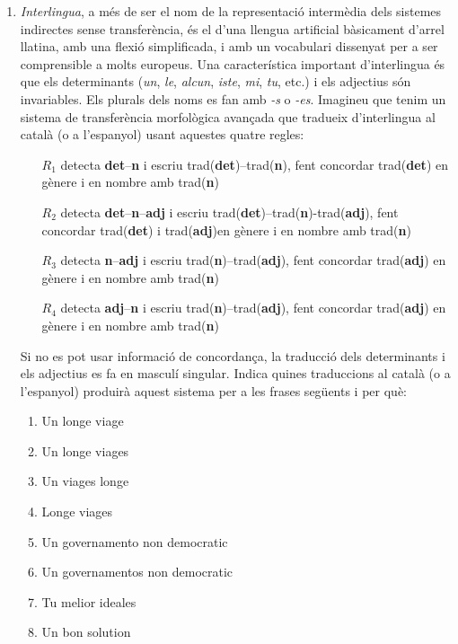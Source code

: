\begin{enumerate}
    \item \emph{Interlingua}, a més de ser el nom de la representació
      intermèdia dels sistemes indirectes sense transferència, és el
      d'una llengua artificial bàsicament d'arrel llatina, amb una
      flexió simplificada, i amb un vocabulari dissenyat per a ser
      comprensible a molts europeus.  Una característica important
      d'interlingua és que els determinants (\emph{un}, \emph{le},
      \emph{alcun}, \emph{iste}, \emph{mi}, \emph{tu}, etc.) i els
      adjectius són invariables. Els plurals dels noms es fan amb
      \emph{-s} o \emph{-es}.  Imagineu que tenim un sistema de
      transferència morfològica avançada que tradueix d'interlingua al
      català (o a l'espanyol) usant aquestes quatre regles:
      \begin{itemize}
      \item[$R_1$] detecta \textbf{det}--\textbf{n} i escriu
        \textsf{trad}(\textbf{det})--\textsf{trad}(\textbf{n}), fent concordar
        \textsf{trad}(\textbf{det}) en gènere i en nombre amb \textsf{trad}(\textbf{n})
      \item[$R_2$] detecta \textbf{det}--\textbf{n}--\textbf{adj} i escriu
        \textsf{trad}(\textbf{det})--\textsf{trad}(\textbf{n})-\textsf{trad}(\textbf{adj}), fent
        concordar \textsf{trad}(\textbf{det}) i \textsf{trad}(\textbf{adj})en gènere i
        en nombre amb \textsf{trad}(\textbf{n})
      \item[$R_3$] detecta \textbf{n}--\textbf{adj} i escriu
        \textsf{trad}(\textbf{n})--\textsf{trad}(\textbf{adj}), fent concordar
        \textsf{trad}(\textbf{adj}) en gènere i en nombre amb \textsf{trad}(\textbf{n})
      \item[$R_4$] detecta \textbf{adj}--\textbf{n} i escriu
        \textsf{trad}(\textbf{n})--\textsf{trad}(\textbf{adj}), fent concordar
        \textsf{trad}(\textbf{adj}) en gènere i en nombre amb \textsf{trad}(\textbf{n})
      \end{itemize}
      Si no es pot usar informació de concordança, la traducció
      dels determinants i els adjectius es fa en masculí singular.
      Indica quines traduccions al català (o a l'espanyol) produirà
      aquest sistema per a les frases següents i per què:
      \begin{enumerate}
      \item \textsf{Un longe viage}
      \item \textsf{Un longe viages}
      \item \textsf{Un viages longe}
      \item \textsf{Longe viages}
      \item \textsf{Un governamento non democratic}
      \item \textsf{Un governamentos non democratic}
      \item \textsf{Tu melior ideales}
      \item \textsf{Un bon solution} 
      \end{enumerate}


\end{enumerate}
